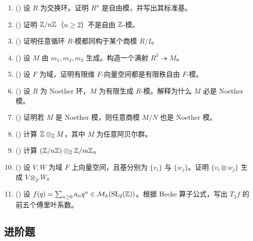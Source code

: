 \begin{enumerate}[label=\textbf{10.\arabic*.}, leftmargin=3.2em]
  \item (\basic) 设 $R$ 为交换环。证明 $R^n$ 是自由模，并写出其标准基。

  \item (\basic) 证明 $\mathbb{Z}/n\mathbb{Z}$（$n\ge 2$）不是自由 $\mathbb{Z}$-模。

  \item (\basic) 证明任意循环 $R$-模都同构于某个商模 $R/I$。

  \item (\basic) 设 $M$ 由 $m_1,m_2,m_3$ 生成。构造一个满射 $R^3\twoheadrightarrow M$。

  \item (\basic) 设 $F$ 为域，证明有限维 $F$-向量空间都是有限秩自由 $F$-模。

  \item (\basic) 设 $R$ 为 Noether 环，$M$ 为有限生成 $R$-模。解释为什么 $M$ 必是 Noether 模。

  \item (\basic) 证明若 $M$ 是 Noether 模，则任意商模 $M/N$ 也是 Noether 模。

  \item (\basic) 计算 $\mathbb{Z}\otimes_{\mathbb{Z}} M$，其中 $M$ 为任意阿贝尔群。

  \item (\basic) 计算 $(\mathbb{Z}/n\mathbb{Z})\otimes_{\mathbb{Z}} \mathbb{Z}/m\mathbb{Z}$。

  \item (\basic) 设 $V,W$ 为域 $F$ 上向量空间，且基分别为 $\{v_i\}$ 与 $\{w_j\}$。证明 $\{v_i\otimes w_j\}$ 生成 $V\otimes_F W$。

  \item (\basic) 设 $f(q)=\sum_{n\ge 0} a_nq^n\in \mathcal{M}_k(\mathrm{SL}_2(\mathbb{Z}))$。根据 Hecke 算子公式，写出 $T_2f$ 的前五个傅里叶系数。
\end{enumerate}

\subsection*{进阶题}

